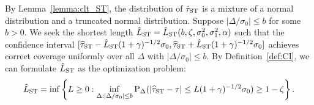 \documentclass[11pt]{article}
\def\P{{\mathrm P}}
\newcommand{\htau}{\widehat\tau}
\numberwithin{equation}{section}
\theoremstyle{definition}
\begin{document}
By Lemma~\ref{lemma:clt_ST}, the distribution of $\hat\tau_{\rm ST}$ is a mixture of a normal distribution and a truncated normal distribution. Suppose $\lvert \Delta/\sigma_0 \rvert \leq b$ for some $b > 0$. We seek the shortest length $\hat{L}_{\rm ST} = \hat{L}_{\rm ST}(b, \zeta, \sigma_0^2, \sigma_1^2, \alpha)$ such that the confidence interval $[\htau_{\rm ST}- \hat{L}_{\rm ST} (1+\gamma)^{-1/2} \sigma_0, \htau_{\rm ST}+ \hat{L}_{\rm ST} (1+\gamma)^{-1/2} \sigma_0]$ achieves correct coverage uniformly over all $\Delta$ with $\lvert \Delta/\sigma_0 \rvert \le b$. By Definition~\ref{def:CI}, we can formulate $\hat{L}_{\rm ST}$ as the optimization problem:
\begin{align}\label{eq:L}
  \hat{L}_{\rm ST} = \inf \left\{ L \ge 0: \inf_{\Delta:\lvert \Delta/\sigma_0 \rvert \le b} \P_\Delta(\lvert \htau_{\rm ST}- \tau \rvert \le L (1+\gamma)^{-1/2} \sigma_0) \ge 1-\zeta\right\}. 
\end{align}
\end{document}
